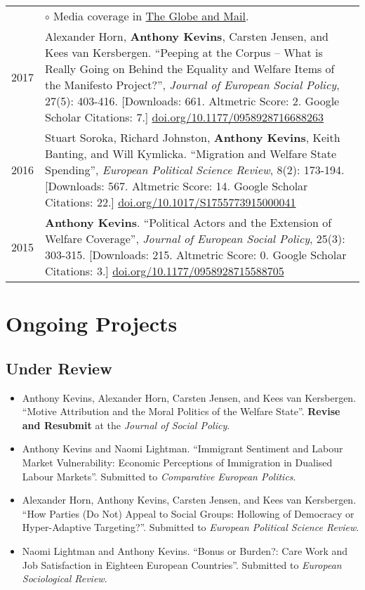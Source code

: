 \documentclass[letterpaper,fontsize=10pt]{scrartcl}
\begin{document}
\begin{tabularx}{\textwidth}{@{} l X @{} }
		& $\circ$ Media coverage in \href{https://www.theglobeandmail.com/opinion/big-tent-politics-is-now-all-but-dead/article24944734/}{The Globe and Mail}.\\
		2017 & Alexander Horn, \textbf{Anthony Kevins}, Carsten Jensen, and Kees van Kersbergen. ``Peeping at the Corpus – What is Really Going on Behind the Equality and Welfare Items of the Manifesto Project?'', \textit{Journal of European Social Policy}, 27(5): 403-416. [Downloads: 661. Altmetric Score: 2. Google Scholar Citations: 7.] \href{https://doi.org/10.1177/0958928716688263}{doi.org/10.1177/0958928716688263}\\[1ex]
		2016 & Stuart Soroka, Richard Johnston, \textbf{Anthony Kevins}, Keith Banting, and Will Kymlicka. “Migration and Welfare State Spending'', \textit{European Political Science Review}, 8(2): 173-194. [Downloads: 567. Altmetric Score: 14. Google Scholar Citations: 22.]
		\href{https://doi.org/10.1017/S1755773915000041}{doi.org/10.1017/S1755773915000041}\\[1ex]
		2015 & \textbf{Anthony Kevins}. ``Political Actors and the Extension of Welfare Coverage'', \textit{Journal of European Social Policy}, 25(3): 303-315. [Downloads: 215. Altmetric Score: 0. Google Scholar Citations: 3.] \href{https://doi.org/10.1177/0958928715588705}{doi.org/10.1177/0958928715588705}
	\end{tabularx}

	\section{Ongoing Projects}
	\vspace{-.5em}

	\subsection{Under Review}
		\vspace{-.5em}
	\begin{itemize}[noitemsep]
		\item Anthony Kevins, Alexander Horn, Carsten Jensen, and Kees van Kersbergen. ``Motive Attribution and the Moral Politics of the Welfare State''. \textbf{Revise and Resubmit} at the \textit{Journal of Social Policy}.
    \item Anthony Kevins and Naomi Lightman. ``Immigrant Sentiment and Labour Market Vulnerability: Economic Perceptions of Immigration in Dualised Labour Markets''. Submitted to \textit{Comparative European Politics}.
    \item Alexander Horn, Anthony Kevins, Carsten Jensen, and Kees van Kersbergen. ``How Parties (Do Not) Appeal to Social Groups: Hollowing of Democracy or Hyper-Adaptive Targeting?''. Submitted to \textit{European Political Science Review}.
    \item Naomi Lightman and Anthony Kevins. ``Bonus or Burden?: Care Work and Job Satisfaction in Eighteen European Countries''. Submitted to \textit{European Sociological Review}.
	\end{itemize}
\end{document}
